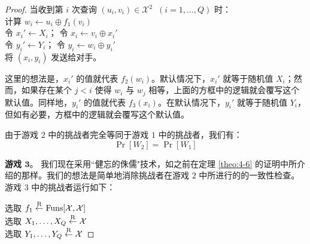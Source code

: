 \begin{proof}
\vspace{5pt}

\hspace*{5pt} 当收到第 $i$ 次查询 $(u_i,v_i)\in\mathcal{X}^2\;\;(i=1,\dots,Q)$ 时：\\
\hspace*{50pt} 计算 $w_i\leftarrow u_i\oplus f_1(v_i)$\\
\hspace*{50pt} 令 $x_i'\leftarrow X_i$；
				令 $x_i\leftarrow v_i\oplus x_i'$\\
\hspace*{50pt} 令 $y_i'\leftarrow Y_i$；
				令 $y_i\leftarrow w_i\oplus y_i'$\\
\hspace*{50pt} 将 $(x_i,y_i)$ 发送给对手。

\vspace{10pt}

\noindent
这里的想法是，$x_i'$ 的值就代表 $f_2(w_i)$。默认情况下，$x_i'$ 就等于随机值 $X_i$；然而，如果存在某个 $j<i$ 使得 $w_i$ 与 $w_j$ 相等，上面的方框中的逻辑就会覆写这个默认值。同样地，$y_i'$ 的值就代表 $f_3(x_i)$。在默认情况下，$y_i'$ 就等于随机值 $Y_i$，但如有必要，方框中的逻辑就会覆写这个默认值。

由于游戏 $2$ 中的挑战者完全等同于游戏 $1$ 中的挑战者，我们有：
\begin{equation}\label{eq:4-26}
\Pr[W_2]=\Pr[W_1]
\end{equation}

\noindent
\textbf{游戏 $\mathbf{3}$}。
我们现在采用``健忘的侏儒"技术，如之前在定理 \ref{theo:4-6} 的证明中所介绍的那样。我们的想法是简单地消除挑战者在游戏 $2$ 中所进行的的一致性检查。游戏 $3$ 中的挑战者运行如下：

\vspace{10pt}

\hspace*{5pt} 选取 $f_1\overset{\rm R}\leftarrow{\rm Funs}[\mathcal{X},\mathcal{X}]$\\
\hspace*{26pt} 选取 $X_1,\dots,X_Q\overset{\rm R}\leftarrow\mathcal{X}$\\
\hspace*{26pt} 选取 $Y_1,\dots,Y_Q\overset{\rm R}\leftarrow\mathcal{X}$

\vspace{5pt}


\end{proof}
